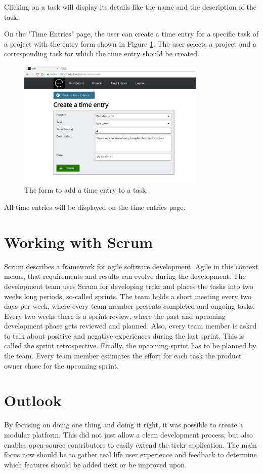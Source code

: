 \documentclass[bibliography=totoc, listof=totocnumbered]{scrartcl}
\begin{document}
Clicking on a task will display its details like the name and the description of
the task.

On the "Time Entries" page, the user can create a time entry for a specific task
of a project with the entry form shown in Figure
\ref{fig:trckr-create-time-entry}. The user selects a project and a
corresponding task for which the time entry should be created.

\begin{figure}[h]
    \includegraphics[width=0.8\textwidth]{trckr-create-time-entry}
    \caption{The form to add a time entry to a task.}
    \label{fig:trckr-create-time-entry}
\end{figure}

All time entries will be displayed on the time entries page.

\section{Working with Scrum}
Scrum describes a framework for agile software development. Agile in this
context means, that requirements and results can evolve during the development.
The development team uses Scrum for developing trckr and places the tasks into
two weeks long periods, so-called sprints. The team holds a short meeting every
two days per week, where every team member presents completed and ongoing tasks.
Every two weeks there is a sprint review, where the past and upcoming
development phase gets reviewed and planned. Also, every team member is asked to
talk about positive and negative experiences during the last sprint. This is
called the sprint retrospective. Finally, the upcoming sprint has to be planned
by the team. Every team member estimates the effort for each task the product
owner chose for the upcoming sprint.

\section{Outlook}
By focusing on doing one thing and doing it right, it was possible to create a
modular platform. This did not just allow a clean development process, but also
enables open-source contributors to easily extend the trckr application. The
main focus now should be to gather real life user experience and feedback to
determine which features should be added next or be improved upon.
\end{document}
